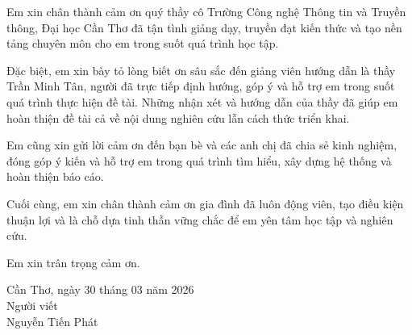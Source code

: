 \documentclass[../main.tex]{subfiles}
\begin{document}
Em xin chân thành cảm ơn quý thầy cô Trường Công nghệ Thông tin và Truyền thông, Đại học Cần Thơ đã tận tình giảng dạy, truyền đạt kiến thức và tạo nền tảng chuyên môn cho em trong suốt quá trình học tập.

Đặc biệt, em xin bày tỏ lòng biết ơn sâu sắc đến giảng viên hướng dẫn là thầy Trần Minh Tân, người đã trực tiếp định hướng, góp ý và hỗ trợ em trong suốt quá trình thực hiện đề tài. Những nhận xét và hướng dẫn của thầy đã giúp em hoàn thiện đề tài cả về nội dung nghiên cứu lẫn cách thức triển khai.

Em cũng xin gửi lời cảm ơn đến bạn bè và các anh chị đã chia sẻ kinh nghiệm, đóng góp ý kiến và hỗ trợ em trong quá trình tìm hiểu, xây dựng hệ thống và hoàn thiện báo cáo.

Cuối cùng, em xin chân thành cảm ơn gia đình đã luôn động viên, tạo điều kiện thuận lợi và là chỗ dựa tinh thần vững chắc để em yên tâm học tập và nghiên cứu.

Em xin trân trọng cảm ơn.

\vspace*{2cm}

\hfill
\begin{minipage}{0.45\textwidth}
\centering
Cần Thơ, ngày 30 tháng 03 năm 2026\\[0.3cm]
Người viết\\[1.5cm]
Nguyễn Tiến Phát
\end{minipage}
\end{document}
